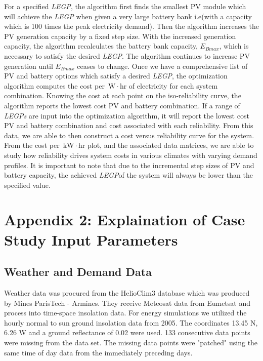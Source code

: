 \documentclass[11p]{article}
\newcommand{\unit}[1]{\ensuremath{\, \mathrm{#1}}}
\begin{document}
For a specified \emph{LEGP}, the algorithm first finds the smallest PV module which will achieve the \emph{LEGP} when given a very large battery bank i.e(with a capacity which is 100 times the peak electricity demand). 
Then the algorithm increases the PV generation capacity by a fixed step size.
With the increased generation capacity, the algorithm recalculates the battery bank capacity, $E_{Bmax}$, which is necessary to satisfy the desired \emph{LEGP}.
The algorithm continues to increase PV generation until $E_{Bmax}$ ceases to change. 
Once we have a comprehensive list of PV and battery options which satisfy a desired \emph{LEGP}, the optimization algorithm computes the cost per \unit{W \! \cdot \!hr} of electricity for each system combination. 
Knowing the cost at each point on the iso-reliability curve, the algorithm reports the lowest cost PV and battery combination. 
If a range of \emph{LEGPs} are input into the optimization algorithm, it will report the lowest cost PV and battery combination and cost associated with each reliability. 
From this data, we are able to then construct a cost versus reliability curve for the system. 
From the cost per \unit{kW \! \cdot \! hr} plot, and the associated data matrices, we are able to study how reliability drives system costs in various climates with varying demand profiles. 
It is important to note that due to the incremental step sizes of PV and battery capacity, the achieved \emph{LEGP}of the system will always be lower than the specified value. 

\section{Appendix 2: Explaination of Case Study Input Parameters} \label{A2}

\subsection{Weather and Demand Data}
Weather data was procured from the HelioClim3 database which was produced by Mines ParisTech - Armines. 
They receive Meteosat data from Eumetsat and process into time-space insolation data. 
For energy simulations we utilized the hourly normal to sun ground insolation data from 2005. 
The coordinates 13.45 N, 6.26 W and a ground reflectance of 0.02 were used.  
133 consecutive data points were missing from the data set. 
The missing data points were "patched" using the same time of day data from the immediately preceding days. 
\end{document}
